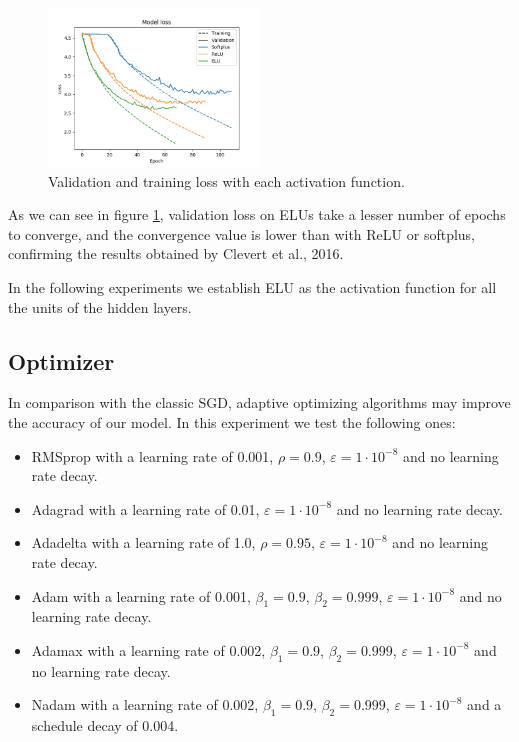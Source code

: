 \documentclass[]{article}
\begin{document}
\begin{figure}[H]
	\centering
	\includegraphics[width=0.5\textwidth]{activation_loss}
	\caption{Validation and training loss with each activation function.}
	\label{f:act1}
\end{figure}

As we can see in figure \ref{f:act1}, validation loss on ELUs take a lesser number of epochs to converge, and the convergence value is lower than with ReLU or softplus, confirming the results obtained by Clevert et al., 2016.

In the following experiments we establish ELU as the activation function for all the units of the hidden layers.

\subsection{Optimizer}

In comparison with the classic SGD, adaptive optimizing algorithms may improve the accuracy of our model. In this experiment we test the following ones:

\begin{itemize}
	\item RMSprop \cite{tieleman2012lecture} with a learning rate of 0.001, $ \rho = 0.9 $, $ \varepsilon = 1 \cdot 10^{-8} $ and no learning rate decay.
	\item Adagrad \cite{duchi2011adaptive} with a learning rate of 0.01, $ \varepsilon = 1 \cdot 10^{-8} $ and no learning rate decay.
	\item Adadelta \cite{zeiler2012adadelta} with a learning rate of 1.0, $ \rho = 0.95 $, $ \varepsilon = 1 \cdot 10^{-8} $ and no learning rate decay.
	\item Adam \cite{kingma2014adam} with a learning rate of 0.001, $ \beta_1 = 0.9 $, $ \beta_2 = 0.999 $, $ \varepsilon = 1 \cdot 10^{-8} $ and no learning rate decay.
	\item Adamax \cite{kingma2014adam} with a learning rate of 0.002, $ \beta_1 = 0.9 $, $ \beta_2 = 0.999 $, $ \varepsilon = 1 \cdot 10^{-8} $ and no learning rate decay.
	\item Nadam \cite{dozat2016incorporating} with a learning rate of 0.002, $ \beta_1 = 0.9 $, $ \beta_2 = 0.999 $, $ \varepsilon = 1 \cdot 10^{-8} $ and a schedule decay of 0.004.
\end{itemize}
\end{document}
